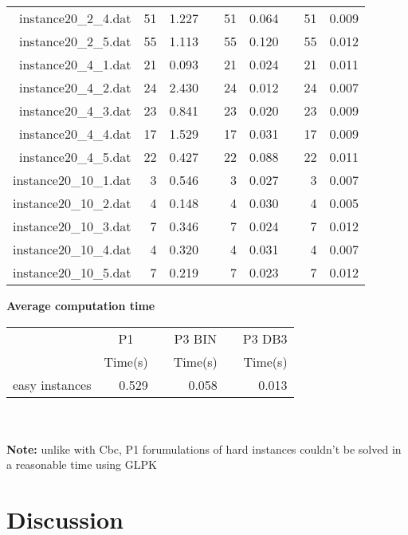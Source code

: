 \begin{table*}[h!]
\begin{tabular}{@{}rrrcrrcrr@{}}
instance20\_2\_4.dat & 51 & 1.227 & & 51 & 0.064 & & 51 & 0.009 \\
instance20\_2\_5.dat & 55 & 1.113 & & 55 & 0.120 & & 55 & 0.012 \\
instance20\_4\_1.dat & 21 & 0.093 & & 21 & 0.024 & & 21 & 0.011 \\
instance20\_4\_2.dat & 24 & 2.430 & & 24 & 0.012 & & 24 & 0.007 \\
instance20\_4\_3.dat & 23 & 0.841 & & 23 & 0.020 & & 23 & 0.009 \\
instance20\_4\_4.dat & 17 & 1.529 & & 17 & 0.031 & & 17 & 0.009 \\
instance20\_4\_5.dat & 22 & 0.427 & & 22 & 0.088 & & 22 & 0.011 \\
instance20\_10\_1.dat & 3 & 0.546 & & 3 & 0.027 & & 3 & 0.007 \\
instance20\_10\_2.dat & 4 & 0.148 & & 4 & 0.030 & & 4 & 0.005 \\
instance20\_10\_3.dat & 7 & 0.346 & & 7 & 0.024 & & 7 & 0.012 \\
instance20\_10\_4.dat & 4 & 0.320 & & 4 & 0.031 & & 4 & 0.007 \\
instance20\_10\_5.dat & 7 & 0.219 & & 7 & 0.023 & & 7 & 0.012 \\
\end{tabular}
\end{table*}
\newpage
\begin{center}
\textbf{Average computation time}
\end{center}
\begin{table*}[h!]\centering
{}
\begin{tabular}{@{}rrcrcr@{}}\toprule
& \multicolumn{1}{c}{P1} & \phantom{abc} & \multicolumn{1}{c}{P3 BIN} & \phantom{abc} & \multicolumn{1}{c}{P3 DB3}\\
& Time(s) & & Time(s) & & Time(s)\\ \midrule
easy instances & 0.529 & & 0.058 & & 0.013 \\
\bottomrule
\end{tabular}
\end{table*}\ \\\\
\textbf{Note:} unlike with Cbc, P1 forumulations of hard instances couldn't be solved in a reasonable time using GLPK
\newpage
\chapter{Discussion}

